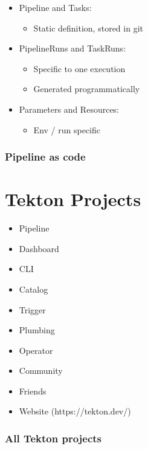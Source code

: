 \documentclass[aspectratio=169,11pt,hyperref={colorlinks=true}]{beamer}
\begin{document}
\begin{lblackrwhiteframe}
\begin{blackframe}
\begin{2columnsframe}
  {
  \begin{itemize}
    \item Pipeline and Tasks:
    \begin{itemize}
      \item Static definition, stored in git
    \end{itemize}
    \item PipelineRuns and TaskRuns:
    \begin{itemize}
      \item Specific to one execution
      \item Generated programmatically
    \end{itemize}
    \item Parameters and Resources:
    \begin{itemize}
      \item Env / run specific
    \end{itemize}
  \end{itemize}
  \vspace{0.3ex}
  
  }
  {
  
  \vspace{0.3ex}
  
  }
  \frametitle{Pipeline as code}
\end{2columnsframe}

\section{Tekton Projects}

\begin{2columnsframe}
  {
  \begin{itemize}
    \item Pipeline
    \item Dashboard
    \item CLI
    \item Catalog
    \item Trigger
    \item Plumbing
  \end{itemize}
  }
  {
  \begin{itemize}
    \item Operator
    \item Community
    \item Friends
    \item Website (https://tekton.dev/)
  \end{itemize}
  }
  \frametitle{All Tekton projects}
\end{2columnsframe}


\end{blackframe}
\end{lblackrwhiteframe}
\end{document}
